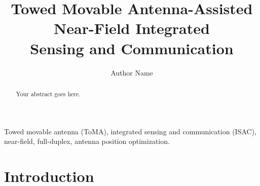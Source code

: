 \documentclass[letterpaper,journal]{IEEEtran}
\begin{document}
\title{Towed Movable Antenna-Assisted Near-Field Integrated\\ Sensing and Communication}

\author{Author Name}

\maketitle

\begin{abstract}
Your abstract goes here.
\end{abstract}

\begin{IEEEkeywords}
Towed movable antenna (ToMA), integrated sensing and communication (ISAC), near-field, full-duplex, antenna position optimization.
\end{IEEEkeywords}

\section{Introduction}
\end{document}
